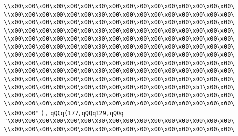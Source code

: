 \verb|\\x00\x00\x00\x00\x00\x00\x00\x00\x00\x00\x00\x00\x00\x00\x00\x00\|\newline
\verb|\\x00\x00\x00\x00\x00\x00\x00\x00\x00\x00\x00\x00\x00\x00\x00\x00\|\newline
\verb|\\x00\x00\x00\x00\x00\x00\x00\x00\x00\x00\x00\x00\x00\x00\x00\x00\|\newline
\verb|\\x00\x00\x00\x00\x00\x00\x00\x00\x00\x00\x00\x00\x00\x00\x00\x00\|\newline
\verb|\\x00\x00\x00\x00\x00\x00\x00\x00\x00\x00\x00\x00\x00\x00\x00\x00\|\newline
\verb|\\x00\x00\x00\x00\x00\x00\x00\x00\x00\x00\x00\x00\x00\x00\x00\x00\|\newline
\verb|\\x00\x00\x00\x00\x00\x00\x00\x00\x00\x00\x00\x00\x00\x00\x00\x00\|\newline
\verb|\\x00\x00\x00\x00\x00\x00\x00\x00\x00\x00\x00\x00\x00\x00\x00\x00\|\newline
\verb|\\x00\x00\x00\x00\x00\x00\x00\x00\x00\x00\x00\x00\x00\x00\x00\x00\|\newline
\verb|\\x00\x00\x00\x00\x00\x00\x00\x00\x00\x00\x00\x00\x00\x00\x00\x00\|\newline
\verb|\\x00\x00\x00\x00\x00\x00\x00\x00\x00\x00\x00\x00\x00\xb1\x00\x00\|\newline
\verb|\\x00\x00\x00\x00\x00\x00\x00\x00\x00\x00\x00\x00\x00\x00\x00\x00\|\newline
\verb|\\x00\x00\x00\x00\x00\x00\x00\x00\x00\x00\x00\x00\x00\x00\x00\x00\|\newline
\verb|\\x00\x00"|\newline
\verb|),|\newline
\verb|qQQq(177,qQQq129,qQQq|\newline
\verb|"\x00\x00\x00\x00\x00\x00\x00\x00\x00\x00\x00\x00\x00\x00\x00\x00\|\newline
\verb|\\x00\x00\x00\x00\x00\x00\x00\x00\x00\x00\x00\x00\x00\x00\x00\x00\|\newline

